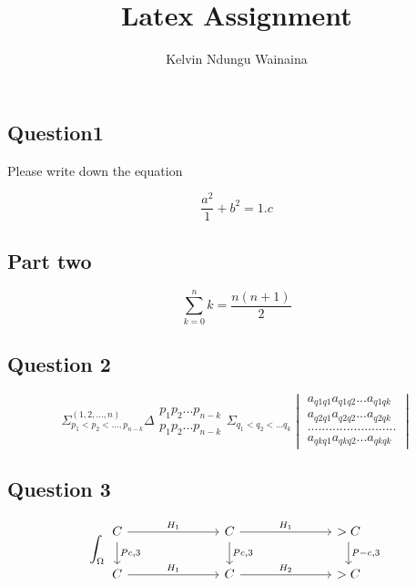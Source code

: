 \documentclass{article}
\title{Latex Assignment }
\author{Kelvin Ndungu Wainaina}
\begin{document}
\maketitle
{}



\subsection{Question1}
Please write down the equation 


\[ \frac{a^2}{1}+b^2 = {1}.{c}  \]

\subsection{Part two}

\[ \sum_{k=0}^{n} {k} = \frac{n(n+1)}{2} \]



\subsection{Question 2}

\[\Sigma^{(1,2,...,n)}_{p_1<p_2<...,p_{n-k}} \Delta \begin{matrix}p_1p_2...p_{n-k}\\p_1p_2...p_{n-k}\end{matrix}\Sigma_{q_1<q_2<...q_k}\begin{vmatrix}a_{q1q1}a_{q1q2}...a_{q1qk}\\a_{q2q1} a_{q2q2}...a_{q2qk}\\.........................\\a_{qkq1}a_{qkq2}...a_{qkqk}\end{vmatrix}\]

\subsection{Question 3}

\begin{equation*}
\int_\Omega
\begin{tikzcd}[column sep=6pc]
C_{} \arrow{r}{H_1} \arrow{d}{Pc,3} & 
C_{} \arrow{r}{H_1} \arrow{d}{Pc,3} &
>C_{} \arrow{d}{P-c,3} \\
C \arrow{r}{H_1} &
C{} \arrow{r}{H_2} &
> C{}
\end{tikzcd}
\end{equation*}
\end{document}
